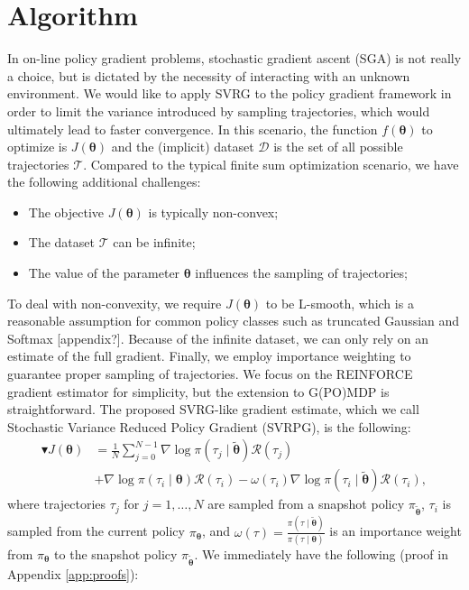 \documentclass{article}
\theoremstyle{remark}
\theoremstyle{definition}
\newcommand{\vtheta}{\boldsymbol{\theta}}
\newcommand{\Reward}{\mathcal{R}}
\newcommand{\pol}{\pi_{\vtheta}}
\begin{document}
\section{Algorithm}
In on-line policy gradient problems, stochastic gradient ascent (SGA) is not really a choice, but is dictated by the necessity of interacting with an unknown environment. We would like to apply SVRG to the policy gradient framework in order to limit the variance introduced by sampling trajectories, which would ultimately lead to faster convergence. In this scenario, the function $f(\vtheta)$ to optimize is $J(\vtheta)$ and the (implicit) dataset $\mathcal{D}$ is the set of all possible trajectories $\mathcal{T}$. Compared to the typical finite sum optimization scenario, we have the following additional challenges:
\begin{itemize}
	\item The objective $J(\vtheta)$ is typically non-convex;
	\item The dataset $\mathcal{T}$ can be infinite;
	\item The value of the parameter $\vtheta$ influences the sampling of trajectories;
\end{itemize}
To deal with non-convexity, we require $J(\vtheta)$ to be L-smooth, which is a reasonable assumption for common policy classes such as truncated Gaussian and Softmax [appendix?]. Because of the infinite dataset, we can only rely on an estimate of the full gradient. Finally, we employ importance weighting \cite{rubinstein1981simulation} \cite{precup2000eligibility} to guarantee proper sampling of trajectories. We focus on the REINFORCE gradient estimator for simplicity, but the extension to G(PO)MDP is straightforward. The proposed SVRG-like gradient estimate, which we call Stochastic Variance Reduced Policy Gradient (SVRPG), is the following:
\begin{align*}
	\blacktriangledown J(\vtheta) &= \frac{1}{N}\sum_{j=0}^{N-1}\nabla\log\pi(\tau_j \mid \tilde{\vtheta})\Reward(\tau_j) \\
		&+ \nabla\log\pi(\tau_i \mid \vtheta)\Reward(\tau_i) 
		- \omega(\tau_i)\nabla\log\pi(\tau_i \mid \tilde{\vtheta})\Reward(\tau_i),
\end{align*}
where trajectories $\tau_j$ for $j=1,\dots,N$ are sampled from a snapshot policy $\pi_{\tilde{\vtheta}}$, $\tau_i$ is sampled from the current policy $\pol$, and $\omega(\tau) = \frac{\pi(\tau\mid\tilde{\vtheta})}{\pi(\tau\mid\vtheta)}$ is an importance weight from $\pol$ to the snapshot policy $\pi_{\tilde{\vtheta}}$. We immediately have the following (proof in Appendix \ref{app:proofs}):
\end{document}
